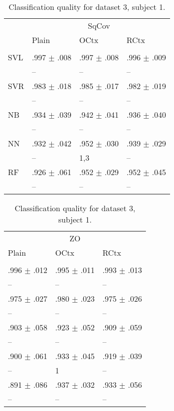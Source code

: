 \begin{table}[htb]
\renewcommand{\arraystretch}{0.6}
\centering
\footnotesize
\caption{Classification quality for dataset 3, subject 1.\label{table:Set3_patient1_res}}
\begin{tabular}{llll}
 & \multicolumn{3}{c}{SqCov} \\
 & Plain & OCtx & RCtx \\
 \cmidrule(lr){2-4}\\
SVL & .997 $\pm$ .008 & .997 $\pm$ .008 & .996 $\pm$ .009 \\
 & -- & -- & -- \\
SVR & .983 $\pm$ .018 & .985 $\pm$ .017 & .982 $\pm$ .019 \\
 & -- & -- & -- \\
NB & .934 $\pm$ .039 & .942 $\pm$ .041 & .936 $\pm$ .040 \\
 & -- & -- & -- \\
NN & .932 $\pm$ .042 & .952 $\pm$ .030 & .939 $\pm$ .029 \\
 & -- & {\scriptsize 1,3} & -- \\
RF & .926 $\pm$ .061 & .952 $\pm$ .029 & .952 $\pm$ .045 \\
 & -- & -- & -- \\
\end{tabular}%
\begin{tabular}{lll}
 \multicolumn{3}{c}{ZO} \\
  Plain & OCtx & RCtx \\
  \cmidrule(lr){1-3}\\
 .996 $\pm$ .012 & .995 $\pm$ .011 & .993 $\pm$ .013 \\
 -- & -- & -- \\
 .975 $\pm$ .027 & .980 $\pm$ .023 & .975 $\pm$ .026 \\
 -- & -- & -- \\
 .903 $\pm$ .058 & .923 $\pm$ .052 & .909 $\pm$ .059 \\
 -- & -- & -- \\
 .900 $\pm$ .061 & .933 $\pm$ .045 & .919 $\pm$ .039 \\
 -- & {\scriptsize 1} & -- \\
 .891 $\pm$ .086 & .937 $\pm$ .032 & .933 $\pm$ .056 \\
 -- & -- & -- \\
\end{tabular}
\end{table}

